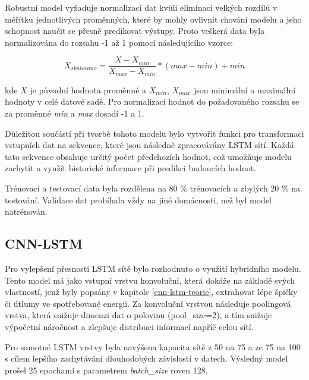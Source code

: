 \documentclass[FM,BP,fonts]{tulthesis}
\begin{document}
Robustní model vyžaduje normalizaci dat kvůli eliminaci velkých rozdílů v měřítku jednotlivých proměnných, které by mohly ovlivnit chování modelu a jeho schopnost naučit se přesně predikovat výstupy. Proto veškerá data byla normalizována do rozsahu -1 až 1 pomocí následujícího vzorce: 

\begin{equation}	
	X_{skalovano} = \frac{X - X_{min}}{X_{max} - X_{min}} * (max - min) + min
\end{equation}

kde $X$ je původní hodnota proměnné a $X_{min}$, $X_{max}$ jsou minimální a maximální hodnoty v celé datové sadě. Pro normalizaci hodnot do požadovaného rozsahu se za proměnné \textit{min} a \textit{max} dosadí -1 a 1.

Důležitou součástí při tvorbě tohoto modelu bylo vytvořit funkci pro transformaci vstupních dat na sekvence, které jsou následně zpracovávány LSTM sítí. Každá tato sekvence obsahuje určitý počet předchozích hodnot, což umožňuje modelu zachytit a využít historické informace při predikci budoucích hodnot.

Trénovací a testovací data byla rozdělena na 80 \% trénovacích a zbylých 20 \% na testování. Validace dat probíhala vždy na jiné domácnosti, než byl model natrénován. 
 
\subsection{CNN-LSTM}

Pro vylepšení přesnosti LSTM sítě bylo rozhodnuto o využití hybridního modelu. Tento model má jako vstupní vrstvu konvoluční, která dokáže na základě svých vlastností, jenž byly popsány v kapitole \ref{cnn-lstm-teorie}, extrahovat lépe špičky či útlumy ve spotřebované energii. Za konvoluční vrstvou následuje poolingová vrstva, která snižuje dimenzi dat o polovinu (pool\_size=2), a tím snižuje výpočetní náročnost a zlepšuje distribuci informací napříč celou sítí.

Pro samotné LSTM vrstvy byla navýšena kapacita sítě z 50 na 75 a ze 75 na 100 s cílem lepšího zachytávání dlouhodobých závislostí v datech. Výsledný model prošel 25 epochami s parametrem \textit{batch\_size} roven 128.
\end{document}
